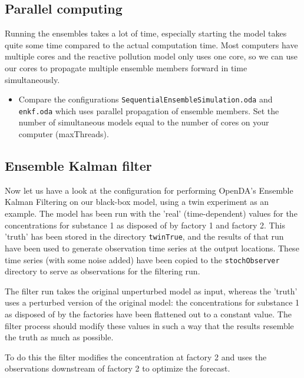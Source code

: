 \subsection{Parallel computing}
Running the ensembles takes a lot of time, especially starting the model takes quite some time compared to the actual computation time. Most computers have multiple cores and the reactive pollution model only uses one core, so we can use our cores to propagate multiple ensemble members forward in time simultaneously. 
\begin{itemize}
	\item Compare the configurations {\tt SequentialEnsembleSimulation.oda} and\\
		{\tt enkf.oda} which uses parallel propagation of ensemble members. Set the number of simultaneous models equal to the number of cores on your computer (maxThreads).
\end{itemize}

\subsection{Ensemble Kalman filter}


Now let us have a look at the configuration for performing OpenDA's Ensemble
Kalman Filtering on our black-box model, using a twin experiment as an example.
The model has been run with the 'real' (time-dependent) values for the
concentrations for substance 1 as disposed of by factory 1 and factory 2. This
'truth' has been stored in the directory {\tt twinTrue}, and the results of that run
have been used to generate observation time series at the output locations.
These time series (with some noise added) have been copied to the {\tt stochObserver} directory to
serve as observations for the filtering run.

The filter run takes the original unperturbed model as input, whereas the 'truth' 
uses a perturbed version of the original model: the concentrations for substance 1 as disposed of by the
factories have been flattened out to a constant value. The filter process
should modify these values in such a way that the results resemble the truth as
much as possible.

To do this the filter modifies the concentration at factory 2 and uses the
observations downstream of factory 2 to optimize the forecast.

